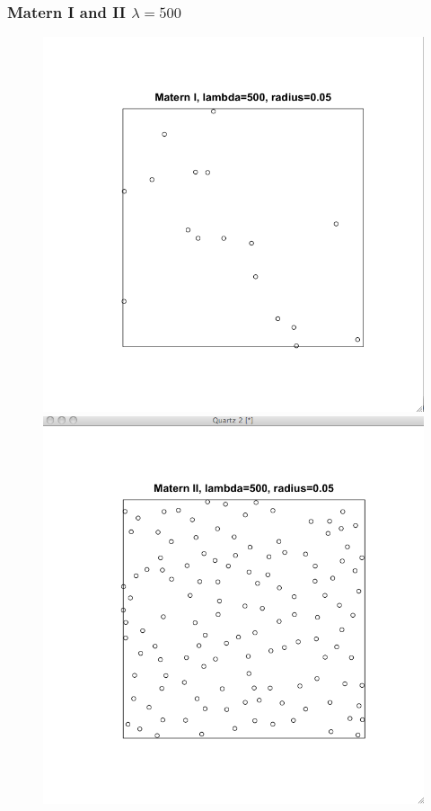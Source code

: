\documentclass[nototal,handout]{beamer}
\begin{document}
\begin{frame}
	\frametitle{Matern I and II $\lambda=500$}
 \begin{figure}[ht]
  \begin{minipage}[b]{0.4\linewidth}
  \centering
  \includegraphics[scale=0.20]{maternI500.png}
  \end{minipage}
  \begin{minipage}[b]{0.4\linewidth}
  \centering
  \includegraphics[scale=0.20]{maternII500.png}
  \end{minipage}

  \end{figure}
 \end{frame} 
\end{document}
